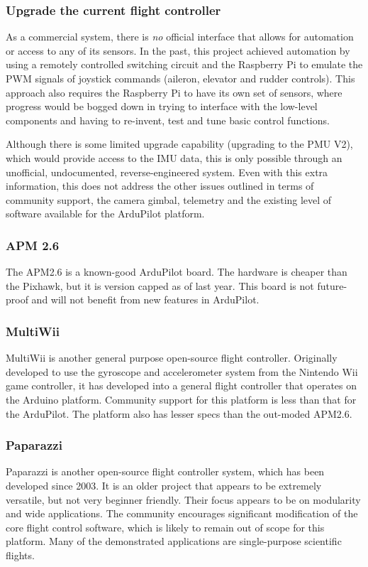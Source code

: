 \documentclass[a4paper, 11pt, titlepage]{article}
\begin{document}
\subsubsection{Upgrade the current flight controller}
As a commercial system, there is \textit{no} official interface that allows for automation or access to any of its sensors. In the past, this project achieved automation by using a remotely controlled switching circuit and the Raspberry Pi to emulate the PWM signals of joystick commands (aileron, elevator and rudder controls). This approach also requires the Raspberry Pi to have its own set of sensors, where progress would be bogged down in trying to interface with the low-level components and having to re-invent, test and tune basic control functions.

Although there is some limited upgrade capability (upgrading to the PMU V2), which would provide access to the IMU data, this is only possible through an unofficial, undocumented, reverse-engineered system. Even with this extra information, this does not address the other issues outlined in terms of community support, the camera gimbal, telemetry and the existing level of software available for the ArduPilot platform.
\subsubsection{APM 2.6}
The APM2.6 is a known-good ArduPilot board. The hardware is cheaper than the Pixhawk, but it is version capped as of last year.  This board is not future-proof and will not benefit from new features in ArduPilot.
\subsubsection{MultiWii}
MultiWii is another general purpose open-source flight controller. Originally developed to use the gyroscope and accelerometer system from the Nintendo Wii game controller, it has developed into a general flight controller that operates on the Arduino platform. Community support for this platform is less than that for the ArduPilot. The platform also has lesser specs than the out-moded APM2.6.
\subsubsection{Paparazzi}
Paparazzi is another open-source flight controller system, which has been developed since 2003. It is an older project that appears to be extremely versatile, but not very beginner friendly.  Their focus appears to be on modularity and wide applications.  The community encourages significant modification of the core flight control software, which is likely to remain out of scope for this platform.   Many of the demonstrated applications are single-purpose scientific flights.
\end{document}
